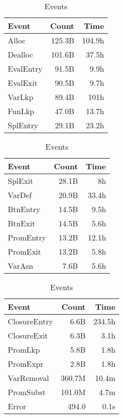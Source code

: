 \documentclass[review,nonacm,screen,acmsmall,anonymous=true]{acmart}
\begin{document}
\begin{table}
  \vspace{-3mm}
  \small
  \caption{Events} \label{table:events}
  \centering
  \begin{tabular}{lrr}
    \toprule
    \bf Event&\bf Count& \bf Time\\
    \midrule
    Alloc&125.3B&104.9h\\
    Dealloc&101.6B&37.5h\\
    EvalEntry&91.5B&9.9h\\
    EvalExit&90.5B&9.7h\\
    VarLkp&89.4B&101h\\
    FunLkp&47.0B&13.7h\\
    SplEntry&29.1B&23.2h\\
    \bottomrule
  \end{tabular}
  \begin{tabular}{lrr}
    \toprule
    \bf Event&\bf Count& \bf Time\\
    \midrule
    SplExit&28.1B&8h\\
    VarDef&20.9B&33.4h\\
    BtnEntry&14.5B&9.5h\\
    BtnExit&14.5B&5.6h\\
    PromEntry&13.2B&12.1h\\
    PromExit&13.2B&5.8h\\
    VarAsn&7.6B&5.6h\\
    \bottomrule
  \end{tabular}
  \begin{tabular}{lrr}
    \toprule
    \bf Event&\bf Count& \bf Time\\
    \midrule
    ClosureEntry&6.6B&234.5h\\
    ClosureExit&6.3B&3.1h\\
    PromLkp&5.8B&1.8h\\
    PromExpr&2.8B&1.8h\\
    VarRemoval&360.7M&10.4m\\
    PromSubst&101.0M&4.7m\\
    Error&494.0&0.1s\\
    \bottomrule
  \end{tabular}
\end{table}
\end{document}
